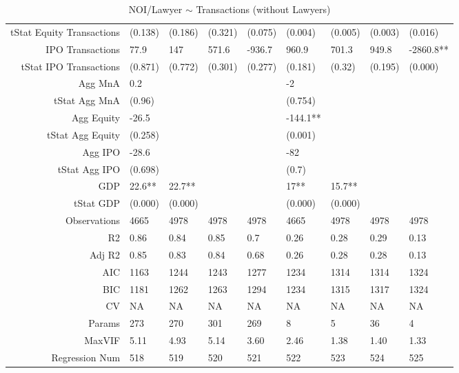 \begin{table}[ht]
\begin{tabular}{rllllllll}
  tStat Equity Transactions & (0.138) & (0.186) & (0.321) & (0.075) & (0.004) & (0.005) & (0.003) & (0.016) \\ 
  IPO Transactions & 77.9 & 147 & 571.6 & -936.7 & 960.9 & 701.3 & 949.8 & -2860.8** \\ 
  tStat IPO Transactions & (0.871) & (0.772) & (0.301) & (0.277) & (0.181) & (0.32) & (0.195) & (0.000) \\ 
  Agg MnA & 0.2 &  &  &  & -2 &  &  &  \\ 
  tStat Agg MnA & (0.96) &  &  &  & (0.754) &  &  &  \\ 
  Agg Equity & -26.5 &  &  &  & -144.1** &  &  &  \\ 
  tStat Agg Equity & (0.258) &  &  &  & (0.001) &  &  &  \\ 
  Agg IPO & -28.6 &  &  &  & -82 &  &  &  \\ 
  tStat Agg IPO & (0.698) &  &  &  & (0.7) &  &  &  \\ 
  GDP & 22.6** & 22.7** &  &  & 17** & 15.7** &  &  \\ 
  tStat GDP & (0.000) & (0.000) &  &  & (0.000) & (0.000) &  &  \\ 
  Observations & 4665 & 4978 & 4978 & 4978 & 4665 & 4978 & 4978 & 4978 \\ 
  R2 & 0.86 & 0.84 & 0.85 & 0.7 & 0.26 & 0.28 & 0.29 & 0.13 \\ 
  Adj R2 & 0.85 & 0.83 & 0.84 & 0.68 & 0.26 & 0.28 & 0.28 & 0.13 \\ 
  AIC & 1163 & 1244 & 1243 & 1277 & 1234 & 1314 & 1314 & 1324 \\ 
  BIC & 1181 & 1262 & 1263 & 1294 & 1234 & 1315 & 1317 & 1324 \\ 
  CV & NA & NA & NA & NA & NA & NA & NA & NA \\ 
  Params & 273 & 270 & 301 & 269 & 8 & 5 & 36 & 4 \\ 
  MaxVIF & 5.11 & 4.93 & 5.14 & 3.60 & 2.46 & 1.38 & 1.40 & 1.33 \\ 
  Regression Num & 518 & 519 & 520 & 521 & 522 & 523 & 524 & 525 \\ 
   \hline
\end{tabular}
\caption{NOI/Lawyer $\sim$ Transactions (without Lawyers)} 
\end{table}
